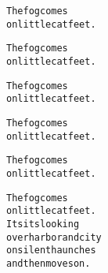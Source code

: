 \begin{alltt}
The fog comes
on little cat feet.
\end{alltt}

\begin{alltt}
The fog comes
on little cat feet.
\end{alltt}

\begin{alltt}
The fog comes
on little cat feet.
\end{alltt}

\begin{alltt}
The fog comes
on little cat feet.
\end{alltt}

\begin{alltt}
The fog comes
on little cat feet.
\end{alltt}

\begin{alltt}
The fog comes
on little cat feet.
It sits looking
over harbor and city
on silent haunches
and then moves on.
\end{alltt}
